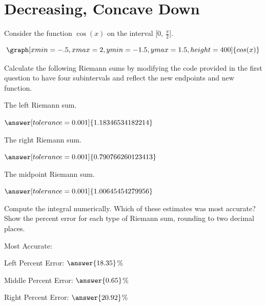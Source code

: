 \documentclass{ximera}
\begin{document}
\section{Decreasing, Concave Down}
\begin{question}
Consider the function $\cos(x)$ on the interval [0, $\frac{\pi}{2}$].

\[
\graph[xmin=-.5,xmax=2,ymin=-1.5,ymax=1.5,height=400]{cos(x)}
\]

Calculate the following Riemann sums by modifying the code provided in the first question to have four subintervals and reflect the new endpoints and new function.

The left Riemann sum.

\begin{onlineOnly}
\begin{sageCell}

\end{sageCell}
\end{onlineOnly}

$\answer[tolerance=0.001]{1.18346534182214}$

The right Riemann sum.

\begin{onlineOnly}
\begin{sageCell}

\end{sageCell}
\end{onlineOnly}

$\answer[tolerance=0.001]{0.790766260123413}$

The midpoint Riemann sum.

\begin{onlineOnly}
\begin{sageCell}

\end{sageCell}
\end{onlineOnly}

$\answer[tolerance=0.001]{1.00645454279956}$

Compute the integral numerically. Which of these estimates was most accurate? Show the percent error for each type of Riemann sum, rounding to two decimal places.

\begin{onlineOnly}
\begin{sageCell}

\end{sageCell}
\end{onlineOnly}

Most Accurate:
\begin{multipleChoice}
\end{multipleChoice}
Left Percent Error: $\answer{18.35}$\%

Middle Percent Error: $\answer{0.65}$\%

Right Percent Error: $\answer{20.92}$\%
\end{question}
\end{document}
